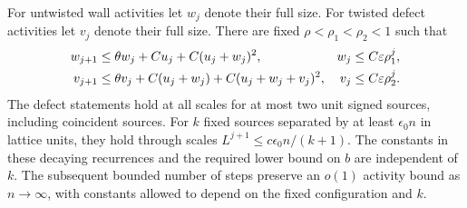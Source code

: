 \begin{proposition}\label{xyf:forced}
For untwisted wall activities let \(w_j\) denote their full size.
For twisted defect activities let \(v_j\) denote their full size.
There are fixed \(\rho<\rho_1<\rho_2<1\) such that
\begin{align}
 w_{j+1}&\le\theta w_j+C u_j+C(u_j+w_j)^2,
             &w_j&\le C\varepsilon\rho_1^j,
             \label{xyf:wallrec}\\
 v_{j+1}&\le\theta v_j+C(u_j+w_j)+C(u_j+w_j+v_j)^2,
             &v_j&\le C\varepsilon\rho_2^j.
             \label{xyf:defectrec}
\end{align}
The defect statements hold at all scales for at most two unit signed
sources, including coincident sources.  For \(k\) fixed sources
separated by at least \(\epsilon_0 n\) in lattice units, they hold
through scales \(L^{j+1}\le c\epsilon_0 n/(k+1)\).
The constants in these decaying recurrences and the required lower
bound on \(b\) are independent of \(k\).  The subsequent bounded
number of steps preserve an \(o(1)\) activity bound as \(n\to\infty\),
with constants allowed to depend on the fixed configuration and \(k\).
\end{proposition}

